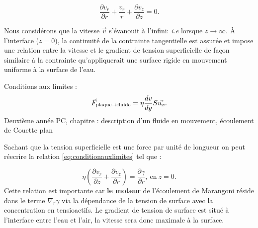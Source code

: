 \documentclass[french, 10pt]{article}
\begin{document}
\begin{equation}
  \frac{\partial v_r}{\partial r}+\frac{v_r}{r}+\frac{\partial v_z}{\partial z}=0.
\end{equation}

Nous considérons que la vitesse $\vec{v}$ s'évanouit à l'infini: \textit{i.e }lorsque $z\rightarrow \infty$. À l'interface ($z=0$), la continuité de la contrainte tangentielle est assurée et impose une relation entre la vitesse et le gradient de tension superficielle de façon similaire à la contrainte qu'appliquerait une surface rigide en mouvement uniforme à la surface de l'eau.  

\begin{Programme}{Conditions aux limites :}
  \begin{equation}
   \vec{F}_{\rm plaque\rightarrow fluide} = \eta\dfrac{d v}{dy}S\vec{u_x}.\label{eq:conditionauxlimites}
  \end{equation}
  Deuxième année PC, chapitre : description d'un fluide en mouvement, écoulement de Couette plan
\end{Programme}

Sachant que la tension superficielle est une force par unité de longueur on peut réecrire la relation \eqref{eq:conditionauxlimites} tel que :

\begin{equation}
  \eta\left(\frac{\partial v_r}{\partial z}+\frac{\partial v_z}{\partial r}\right) = \frac{\partial \gamma}{\partial r}, ~\text{en}~z=0.\label{eq:CL}
\end{equation}
Cette relation est importante car  \textbf{le moteur} de l'écoulement de Marangoni réside dans le terme $\nabla_r\gamma$ via la dépendance de la tension de surface avec la concentration en tensioactifs. Le gradient de tension de surface est situé à l'interface entre l'eau et l'air, la vitesse sera donc maximale à la surface.\medskip%

\end{document}
